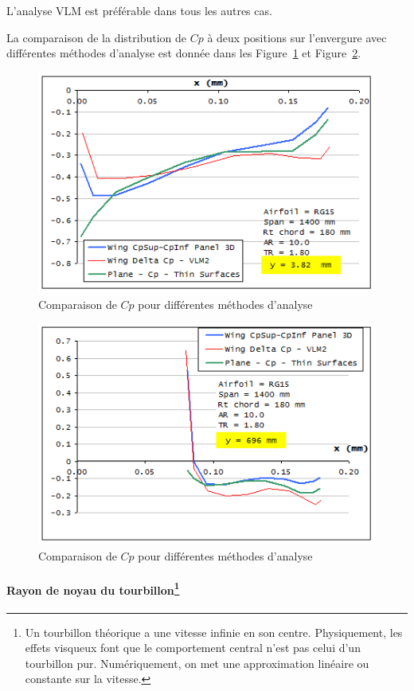 \documentclass[a4paper,twoside,12pt,dvips]{article}
\begin{document}
L’analyse VLM est préférable dans tous les autres cas.

La comparaison de la distribution de $Cp$ à deux positions sur l’envergure 
avec différentes méthodes d’analyse est donnée dans les 
Figure~\ref{img:comparaison_cp_pour_différentes_méthodes_analyse_1} et
Figure~\ref{img:comparaison_cp_pour_différentes_méthodes_analyse_2}.

\begin{figure}[htbp]
	\includegraphics[width=0.7\linewidth]{img-25}\centering 
	\caption{Comparaison de $Cp$ pour différentes méthodes d’analyse}
	\label{img:comparaison_cp_pour_différentes_méthodes_analyse_1}
\end{figure}

\begin{figure}[htbp]
	\includegraphics[width=0.7\linewidth]{img-26}\centering 
	\caption{Comparaison de $Cp$ pour différentes méthodes d’analyse}
	\label{img:comparaison_cp_pour_différentes_méthodes_analyse_2}
\end{figure}

\clearpage

\paragraph{Rayon de noyau du tourbillon\protect\footnote{Un tourbillon théorique a une vitesse infinie en son centre. Physiquement, les effets visqueux font que le comportement central n’est pas celui d’un tourbillon pur. Numériquement, on met une approximation linéaire ou constante sur la vitesse.}}
\end{document}
